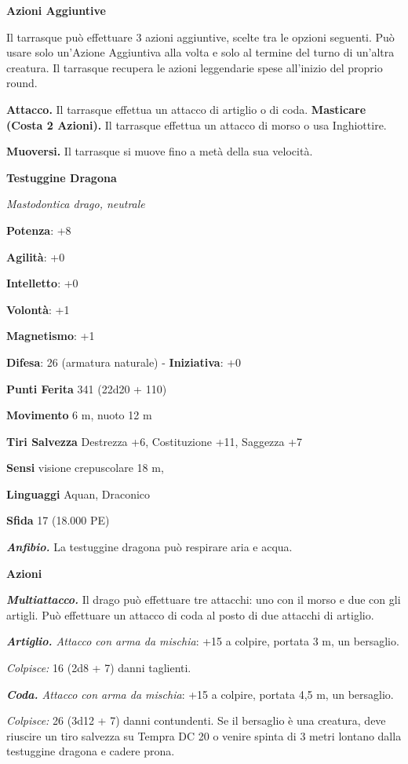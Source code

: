 \begin{multicols}{2}
\textbf{Azioni Aggiuntive}

Il tarrasque può effettuare 3 azioni aggiuntive, scelte tra le opzioni
seguenti. Può usare solo un'Azione Aggiuntiva alla volta e solo al
termine del turno di un'altra creatura. Il tarrasque recupera le azioni
leggendarie spese all'inizio del proprio round.

\textbf{Attacco.} Il tarrasque effettua un attacco di artiglio o di
coda. \textbf{Masticare (Costa 2 Azioni).} Il tarrasque effettua un
attacco di morso o usa Inghiottire.

\textbf{Muoversi.} Il tarrasque si muove fino a metà della sua velocità.




\textbf{Testuggine Dragona}

\emph{Mastodontica drago, neutrale}

\textbf{Potenza}: +8

\textbf{Agilità}: +0

\textbf{Intelletto}: +0

\textbf{Volontà}: +1

\textbf{Magnetismo}: +1

\textbf{Difesa}: 26 (armatura naturale) - \textbf{Iniziativa}: +0

\textbf{Punti Ferita} 341 (22d20 + 110)

\textbf{Movimento} 6 m, nuoto 12 m

\textbf{Tiri Salvezza} Destrezza +6, Costituzione +11, Saggezza +7

\textbf{Sensi} visione crepuscolare 18 m, 

\textbf{Linguaggi} Aquan, Draconico

\textbf{Sfida} 17 (18.000 PE)\smallskip

\emph{\textbf{Anfibio.}} La testuggine dragona può respirare aria e
acqua.

\smallskip\textbf{Azioni}

\emph{\textbf{Multiattacco.}} Il drago può effettuare tre attacchi: uno
con il morso e due con gli artigli. Può effettuare un attacco di coda al
posto di due attacchi di artiglio.

\emph{\textbf{Artiglio.} Attacco con arma da mischia}: +15 a colpire,
portata 3 m, un bersaglio.

\emph{Colpisce:} 16 (2d8 + 7) danni taglienti.

\emph{\textbf{Coda.} Attacco con arma da mischia}: +15 a colpire,
portata 4,5 m, un bersaglio.

\emph{Colpisce:} 26 (3d12 + 7) danni contundenti. Se il bersaglio è una
creatura, deve riuscire un tiro salvezza su Tempra DC 20 o venire spinta
di 3 metri lontano dalla testuggine dragona e cadere prona.


\end{multicols}
